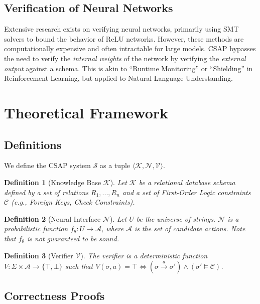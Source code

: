 \documentclass[11pt]{article}
\newtheorem{definition}{Definition}
\begin{document}
\subsection{Verification of Neural Networks}
Extensive research exists on verifying neural networks, primarily using SMT solvers to bound the behavior of ReLU networks. However, these methods are computationally expensive and often intractable for large models. CSAP bypasses the need to verify the \textit{internal weights} of the network by verifying the \textit{external output} against a schema. This is akin to ``Runtime Monitoring'' or ``Shielding'' in Reinforcement Learning, but applied to Natural Language Understanding.

\section{Theoretical Framework}

\subsection{Definitions}
We define the CSAP system $\mathcal{S}$ as a tuple $\langle \mathcal{K}, \mathcal{N}, \mathcal{V} \rangle$.

\begin{definition}[Knowledge Base $\mathcal{K}$]
Let $\mathcal{K}$ be a relational database schema defined by a set of relations $R_1, ..., R_n$ and a set of First-Order Logic constraints $\mathcal{C}$ (e.g., Foreign Keys, Check Constraints).
\end{definition}

\begin{definition}[Neural Interface $\mathcal{N}$]
Let $U$ be the universe of strings. $\mathcal{N}$ is a probabilistic function $f_\theta: U \rightarrow \mathcal{A}$, where $\mathcal{A}$ is the set of candidate actions. Note that $f_\theta$ is not guaranteed to be sound.
\end{definition}

\begin{definition}[Verifier $\mathcal{V}$]
The verifier is a deterministic function $V: \Sigma \times \mathcal{A} \rightarrow \{\top, \bot\}$ such that $V(\sigma, a) = \top \iff (\sigma \xrightarrow{a} \sigma') \land (\sigma' \models \mathcal{C})$.
\end{definition}

\subsection{Correctness Proofs}
\end{document}
